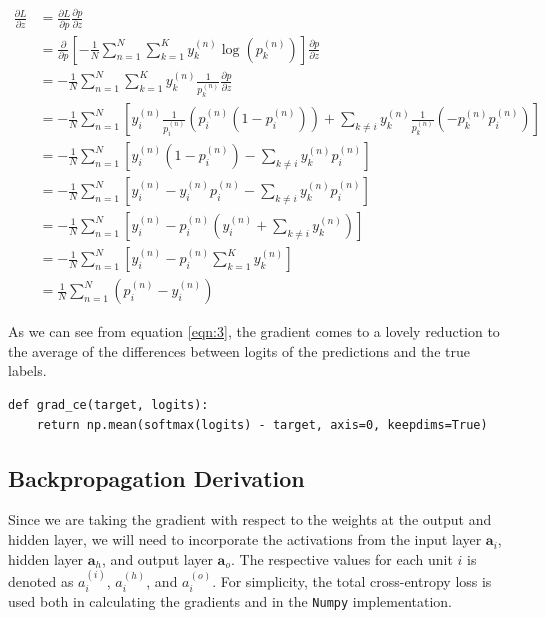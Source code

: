 \documentclass[letter]{article}
\begin{document}
\begin{align*}
\frac{\partial{L}}{\partial{z}} &= \frac{\partial{L}}{\partial{p}} \frac{\partial{p}}{\partial{z}} \\
&= \frac{\partial{}}{\partial{p}} \left[ -\frac{1}{N} \sum_{n = 1}^N \sum_{k = 1}^K y_k^{(n)} \log\left(p_k^{(n)}\right) \right] \frac{\partial{p}}{\partial{z}} \\
&= -\frac{1}{N} \sum_{n = 1}^N \sum_{k = 1}^K y_k^{(n)} \frac{1}{p_k^{(n)}} \frac{\partial{p}}{\partial{z}} \\
&= -\frac{1}{N} \sum_{n = 1}^N \left[ y_i^{(n)} \frac{1}{p_i^{(n)}} \left( p_i^{(n)} (1 - p_i^{(n)}) \right) + \sum_{k \neq i} y_k^{(n)} \frac{1}{p_k^{(n)}} \left( -p_k^{(n)} p_i^{(n)} \right) \right] \\
&= -\frac{1}{N} \sum_{n = 1}^N \left[ y_i^{(n)} (1 - p_i^{(n)}) - \sum_{k \neq i} y_k^{(n)} p_i^{(n)} \right] \\
&= -\frac{1}{N} \sum_{n = 1}^N \left[ y_i^{(n)} - y_i^{(n)} p_i^{(n)} - \sum_{k \neq i} y_k^{(n)} p_i^{(n)} \right] \\
&= -\frac{1}{N} \sum_{n = 1}^N \left[ y_i^{(n)} - p_i^{(n)} \left( y_i^{(n)} + \sum_{k \neq i} y_k^{(n)} \right) \right] \\
&= -\frac{1}{N} \sum_{n = 1}^N \left[ y_i^{(n)} - p_i^{(n)} \sum_{k = 1}^K y_k^{(n)} \right] \\
&= \frac{1}{N} \sum_{n = 1}^N \left( p_i^{(n)} - y_i^{(n)} \right) \label{eqn:3} \tag{3}
\end{align*}

\noindent
As we can see from equation \ref{eqn:3}, the gradient comes to a lovely reduction to the average of the differences between logits of the predictions and the true labels. 

\begin{lstlisting}
def grad_ce(target, logits):
    return np.mean(softmax(logits) - target, axis=0, keepdims=True)
\end{lstlisting}

\newpage

\subsection{Backpropagation Derivation} \label{backprop}

Since we are taking the gradient with respect to the weights at the output and hidden layer, we will need to incorporate the activations from the input layer $\textbf{a}_i$, hidden layer $\textbf{a}_h$, and output layer $\textbf{a}_o$. The respective values for each unit $i$ is denoted as $a_i^{(i)}$, $a_i^{(h)}$, and $a_i^{(o)}$. For simplicity, the total cross-entropy loss is used both in calculating the gradients and in the \texttt{Numpy} implementation.
\end{document}
